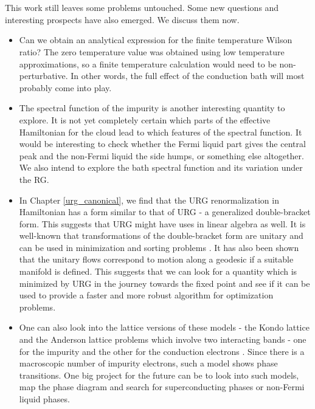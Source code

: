 \documentclass[twoside,11pt]{report}
\numberwithin{equation}{section}
\begin{document}
\\\\This work still leaves some problems untouched. Some new questions and interesting prospects have also emerged. We discuss them now.
\begin{itemize}
	\item Can we obtain an analytical expression for the finite temperature Wilson ratio? The zero temperature value was obtained using low temperature approximations, so a finite temperature calculation would need to be non-perturbative. In other words, the full effect of the conduction bath will most probably come into play.
	\item The spectral function of the impurity is another interesting quantity to explore. It is not yet completely certain which parts of the effective Hamiltonian for the cloud lead to which features of the spectral function. It would be interesting to check whether the Fermi liquid part gives the central peak and the non-Fermi liquid the side humps, or something else altogether. We also intend to explore the bath spectral function and its variation under the RG.
	\item In Chapter \ref{urg_canonical}, we find that the URG renormalization in Hamiltonian has a form similar to that of URG - a generalized double-bracket form. This suggests that URG might have uses in linear algebra as well. It is well-known that transformations of the double-bracket form are unitary and can be used in minimization and sorting problems \cite{Brockett1991}. It has also been shown that the unitary flows correspond to motion along a geodesic if a suitable manifold is defined. This suggests that we can look for a quantity which is minimized by URG in the journey towards the fixed point and see if it can be used to provide a faster and more robust algorithm for optimization problems.
	\item One can also look into the lattice versions of these models - the Kondo lattice and the Anderson lattice problems which involve two interacting bands - one for the impurity and the other for the conduction electrons \cite{gulacsi}. Since there is a macroscopic number of impurity electrons, such a model shows phase transitions. One big project for the future can be to look into such models, map the phase diagram and search for superconducting phases or non-Fermi liquid phases.

\end{itemize}
\end{document}
